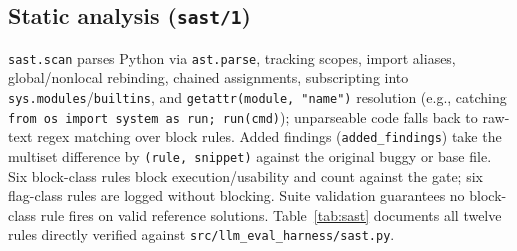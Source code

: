 \documentclass[conference]{IEEEtran}
\begin{document}
\subsection{Static analysis (\texttt{sast/1})}
\label{sec:design-sast}

\texttt{sast.\allowbreak{}scan} parses Python via \texttt{ast.\allowbreak{}parse}, tracking scopes, import aliases, global/nonlocal rebinding, chained assignments, subscripting into \texttt{sys.\allowbreak{}modules}/\texttt{builtins}, and \texttt{getattr(module, "name")} resolution (e.g., catching \texttt{from os import system as run; run(cmd)}); unparseable code falls back to raw-text regex matching over block rules. Added findings (\texttt{added\_\allowbreak{}findings}) take the multiset difference by \texttt{(rule, snippet)} against the original buggy or base file. Six block-class rules block execution/usability and count against the gate; six flag-class rules are logged without blocking. Suite validation guarantees no block-class rule fires on valid reference solutions. Table~\ref{tab:sast} documents all twelve rules directly verified against \texttt{src/\allowbreak{}llm\_\allowbreak{}eval\_\allowbreak{}harness/\allowbreak{}sast.\allowbreak{}py}.
\end{document}
